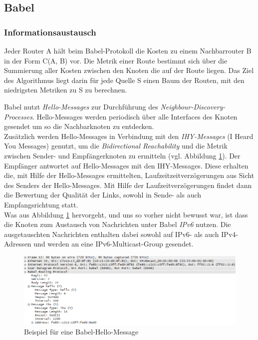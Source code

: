 \documentclass[10pt]{scrartcl}
\begin{document}
\subsection{Babel}
\subsubsection{Informationsaustausch}
Jeder Router A hält beim Babel-Protokoll die Kosten zu einem Nachbarrouter B in der Form C(A, B) vor. Die Metrik einer Route bestimmt sich über die Summierung aller Kosten zwischen den Knoten die auf der Route liegen. Das Ziel des Algorithmus liegt darin für jede Quelle S einen Baum der Routen, mit den niedrigsten Metriken zu S zu berechnen.

Babel nutzt \textit{Hello-Messages} zur Durchführung des \textit{Neighbour-Discovery-Processes}.
Hello-Messages werden periodisch über alle Interfaces des Knoten gesendet um so die Nachbarknoten zu entdecken.\\
Zusätzlich werden Hello-Messages in Verbindung mit den \textit{IHY-Messages} (I Heard You Messages) genutzt, um die \textit{Bidirectional Reachability} und die Metrik zwischen Sender- und Empfängerknoten zu ermitteln (vgl. Abbildung \ref{fig:BabelHelloMessage}).
Der Empfänger antwortet auf Hello-Messages mit den IHY-Messages. 
Diese erhalten die, mit Hilfe der Hello-Messages ermittelten, Laufzeitzeitverzögerungen aus Sicht des Senders der Hello-Messages.
Mit Hilfe der Laufzeitverzögerungen findet dann die Bewertung der Qualität der Links, sowohl in Sende- als auch Empfangsrichtung statt.\\

Was aus Abbildung \ref{fig:BabelHelloMessage} hervorgeht, und uns so vorher nicht bewusst war, ist dass die Knoten zum Austausch von Nachrichten unter Babel \textit{IPv6} nutzen.
Die ausgetauschten Nachrichten enthalten dabei sowohl auf IPv6- als auch IPv4-Adressen und werden an eine IPv6-Multicast-Group gesendet.

\begin{figure}[htbp]
	\centering	\includegraphics[width=1.0\textwidth]{Grafiken/babel_hello_message_example.png}
	\caption{Beispiel für eine Babel-Hello-Message}
	\label{fig:BabelHelloMessage}
\end{figure} 
\end{document}
